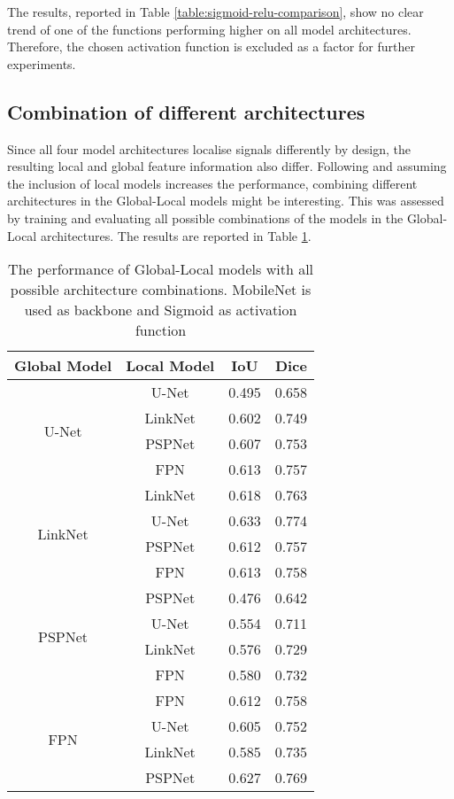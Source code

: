 The results, reported in Table \ref{table:sigmoid-relu-comparison}, show no clear trend of one of the functions performing higher on all model architectures. Therefore, the chosen activation function is excluded as a factor for further experiments.

\subsection{Combination of different architectures}

Since all four model architectures localise signals differently by design, the resulting local and global feature information also differ. Following \citeauthor{Oota_2023_WACV} and assuming the inclusion of local models increases the performance, combining different architectures in the Global-Local models might be interesting. This was assessed by training and evaluating all possible combinations of the models in the Global-Local architectures. The results are reported in Table \ref{table:global-local-mixed}.

\begin{table}[htb!]
	\centering
	\begin{tabular}{c|c| c| c}
		Global Model & Local Model & IoU & Dice \\ \hline\hline
		\multirow{4}{*}{U-Net} & U-Net & 0.495 & 0.658\\
		 & LinkNet  & 0.602 & 0.749 \\
		 & PSPNet & 0.607 & 0.753 \\
		 & FPN & 0.613 & 0.757 \\\hline
		 \multirow{4}{*}{LinkNet} & LinkNet & 0.618 & 0.763 \\
		 & U-Net  & 0.633 & 0.774 \\
		 & PSPNet & 0.612 & 0.757 \\
		 & FPN & 0.613 & 0.758 \\\hline
		 \multirow{4}{*}{PSPNet} & PSPNet & 0.476 &  0.642\\
		 & U-Net  & 0.554 & 0.711 \\
		 & LinkNet & 0.576 & 0.729 \\
		 & FPN & 0.580 & 0.732 \\\hline
		 \multirow{4}{*}{FPN} & FPN & 0.612 & 0.758 \\
		 & U-Net  & 0.605 & 0.752 \\
		 & LinkNet & 0.585 & 0.735 \\
		 & PSPNet & 0.627 & 0.769 \\\hline
	\end{tabular}
	\caption{The performance of Global-Local models with all possible architecture combinations. MobileNet is used as backbone and Sigmoid as activation function}
	\label{table:global-local-mixed}	
\end{table}

